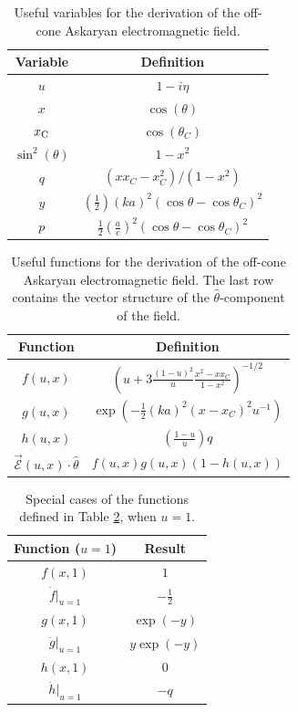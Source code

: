 \documentclass[amsmath,amssymb,aps,prd,10pt,twocolumn]{revtex4}
\begin{document}
\begin{table}
\renewcommand{\arraystretch}{1.5}
\begin{tabular}{| c | c |} \hline
Variable & Definition \\ \hline
$u$ & $1-i\eta$ \\
$x$ & $\cos(\theta)$ \\
$x_{\rm C}$ & $\cos(\theta_C)$ \\
$\sin^2(\theta)$ & $1 - x^2$ \\
$q$ & $(x x_C - x^2_C)/(1-x^2)$ \\
$y$ & $\left( \frac{1}{2} \right) (ka)^2 (\cos\theta - \cos\theta_C)^2$ \\
$p$ & $\frac{1}{2}\left(\frac{a}{c}\right)^2 \left(\cos\theta - \cos\theta_C\right)^2$ \\ \hline
\end{tabular}
\caption{\label{tab:features_2} Useful variables for the derivation of the off-cone Askaryan electromagnetic field.}
\end{table}

\begin{table}
\renewcommand{\arraystretch}{2}
\begin{tabular}{| c | c |} \hline
Function & Definition \\ \hline
$f(u,x)$ & $\left( u + 3 \frac{(1-u)^2}{u} \frac{x^2 - x x_C}{1-x^2} \right)^{-1/2}$ \\
$g(u,x)$ & $\exp \left( -\frac{1}{2}(ka)^2 (x - x_C)^2 u^{-1} \right)$ \\
$h(u,x)$ & $\left( \frac{1-u}{u} \right) q$ \\
$\vec{\mathcal{E}}(u,x) \cdot \hat{\theta}$ & $f(u,x) g(u,x)(1 - h(u,x))$ \\ \hline
\end{tabular}
\caption{\label{tab:features_3} Useful functions for the derivation of the off-cone Askaryan electromagnetic field.  The last row contains the vector structure of the $\hat{\theta}$-component of the field.}
\end{table}

\begin{table}
\begin{tabular}{| c | c |} \hline
Function ($u = 1$) & Result \\ \hline
$f(x,1)$ & $1$ \\
$\dot{f}|_{u = 1}$ & $-\frac{1}{2}$ \\
$g(x,1)$ & $\exp(-y)$ \\
$\dot{g}|_{u = 1}$ & $y \exp(-y)$ \\
$h(x,1)$ & $0$ \\
$\dot{h}|_{u = 1}$ & $-q$ \\ \hline
\end{tabular}
\caption{\label{tab:features_4} Special cases of the functions defined in Table \ref{tab:features_3}, when $u = 1$.}
\end{table}
\end{document}
